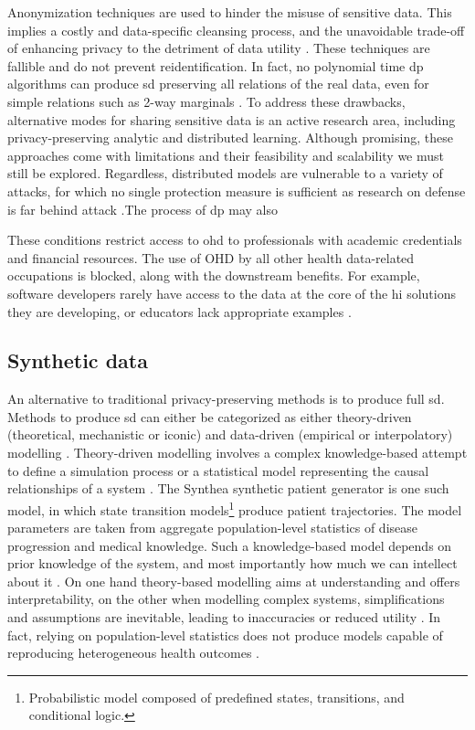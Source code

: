         Anonymization techniques are used to hinder the misuse of sensitive data. This implies a costly and data-specific cleansing process, and the unavoidable trade-off of enhancing privacy to the detriment of data utility \cite{Dankar2012-bd, Cheu2019-vh, De_Cristofaro2020-tl}. These techniques are fallible and do not prevent reidentification. In fact, no polynomial time \gls{dp} algorithms can produce \gls{sd} preserving all relations of the real data, even for simple relations such as 2-way marginals \cite{Ullman2011}. To address these drawbacks, alternative modes for sharing sensitive data is an active research area, including privacy-preserving analytic and distributed learning. Although promising, these approaches come with limitations and their feasibility and scalability we must still be explored. Regardless, distributed models are vulnerable to a variety of attacks, for which no single protection measure is sufficient as research on defense is far behind attack \cite{enthoven2020overview, Gao2020}.The process of \gls{dp} may also \par
        These conditions restrict access to \gls{ohd} to professionals with academic credentials and financial resources. The use of OHD by all other health data-related occupations is blocked, along with the downstream benefits. For example, software developers rarely have access to the data at the core of the \gls{hi} solutions they are developing, or educators lack appropriate examples \cite{laderas_teaching_2018}.
        
    \subsection{Synthetic data}
        An alternative to traditional privacy-preserving methods is to produce full \gls{sd}. Methods to produce \gls{sd} can either be categorized as either theory-driven (theoretical, mechanistic or iconic) and data-driven (empirical or interpolatory) modelling \cite{Kim_2017, Hand2019}. Theory-driven modelling involves a complex knowledge-based attempt to define a simulation process or a statistical model representing the causal relationships of a system \cite{Yousefi2018-dy, Kansal2018-dx}. The Synthea \cite{Walonoski_2017} synthetic patient generator is one such model, in which state transition models\footnote{Probabilistic model composed of predefined states, transitions, and conditional logic.} produce patient trajectories. The model parameters are taken from aggregate population-level statistics of disease progression and medical knowledge. Such a knowledge-based model depends on prior knowledge of the system, and most importantly how much we can intellect about it \cite{Kim_2017, Bonnery2019-ug}. On one hand theory-based modelling aims at understanding and offers interpretability, on the other when modelling complex systems, simplifications and assumptions are inevitable, leading to inaccuracies or reduced utility \cite{Hand2019, Rankin2020}. In fact, relying on population-level statistics does not produce models capable of reproducing heterogeneous health outcomes \cite{Chen_2019}.\par
        
